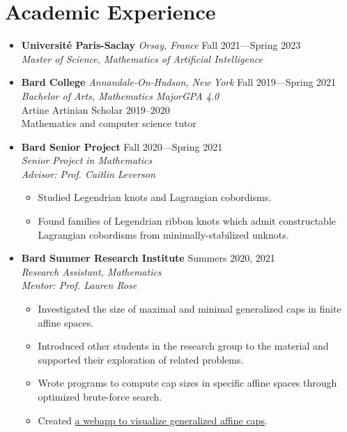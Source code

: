 \documentclass[12pt,letterpaper]{article}
\newenvironment{explist}
{\begin{itemize}[label=\textbf{--},itemsep=1pt,topsep=0pt,partopsep=0pt,parsep=0pt]}
{\end{itemize}}
\begin{document}
\section*{Academic Experience}
\begin{itemize}[label=]
    \item
        \textbf{Université Paris-Saclay} \textit{Orsay, France} \hfill Fall 2021---Spring 2023\\
        \textit{Master of Science, Mathematics of Artificial Intelligence}

    \item
        \textbf{Bard College} \textit{Annandale-On-Hudson, New York} \hfill Fall 2019---Spring 2021\\
        \textit{Bachelor of Arts, Mathematics Major}\hfill \textit{GPA 4.0}\\
        Artine Artinian Scholar 2019--2020\\
        Mathematics and computer science tutor

    \item
        \textbf{Bard Senior Project} \hfill Fall 2020---Spring 2021\\
        \textit{Senior Project in Mathematics}\\
        \textit{Advisor: Prof. Caitlin Leverson}
        \begin{explist}
        \item Studied Legendrian knots and Lagrangian cobordisms.
        \item Found families of Legendrian ribbon knots which admit constructable Lagrangian cobordisms from minimally-stabilized unknots.
        \end{explist}

    \item
        \textbf{Bard Summer Research Institute} \hfill Summers 2020, 2021\\
        \textit{Research Assistant, Mathematics}\\
        \textit{Mentor: Prof. Lauren Rose}
        \begin{explist}
        \item Investigated the size of maximal and minimal generalized caps in finite affine spaces.
        \item Introduced other students in the research group to the material and supported their exploration of related problems.
        \item Wrote programs to compute cap sizes in specific affine spaces through optimized brute-force search.
        \item Created \href{https://slickytail.github.io/QuadsVis/index.html}{a webapp to visualize generalized affine caps}.
        \end{explist}


\end{itemize}
\end{document}
